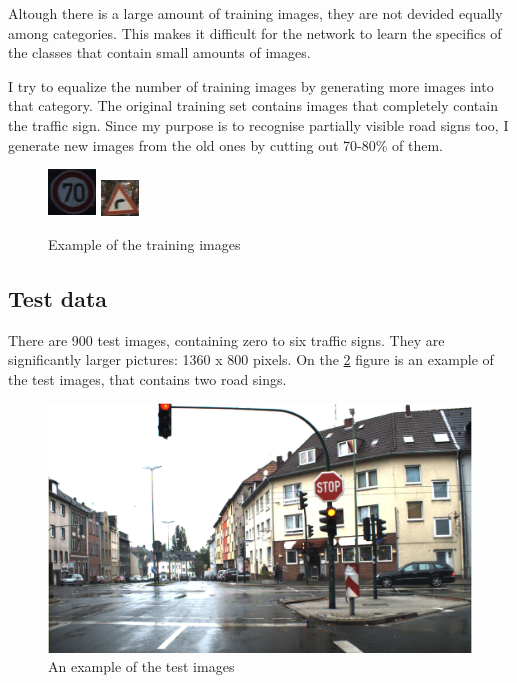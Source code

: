 Altough there is a large amount of training images, they are not devided equally among categories. This                       makes it difficult for the network to learn the specifics of the classes that contain small amounts of images.

I try to equalize the number of training images by generating more images into that category. The original training set contains images that completely contain the traffic sign. Since my purpose is to recognise partially visible road signs too, I generate new images from the old ones by cutting out 70-80\% of them.

\begin{figure}
\centering

\includegraphics{trainingImage}
\includegraphics{trainingImage2}
\caption{Example of the training images}

\label{fig:trainingImage}
\end{figure}

\subsection{Test data}

There are 900 test images, containing zero to six traffic signs. They are significantly larger pictures: 1360 x 800 pixels. On the \ref{fig:trainingImage} figure is an example of the test images, that contains two road sings.

\begin{figure}[h]
\centering

\includegraphics[scale=0.4]{testImage}
\caption{An example of the test images}

\label{fig:trainingImage}
\end{figure}

